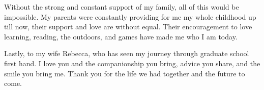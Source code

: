 Without the strong and constant support of my family, all of this would be impossible. My parents were constantly providing for me my whole childhood up till now, their support and love are without equal. Their encouragement to love learning, reading, the outdoors, and games have made me who I am today. 

Lastly, to my wife Rebecca, who has seen my journey through graduate school first hand. I love you and the companionship you bring, advice you share, and the smile you bring me. Thank you for the life we had together and the future to come.